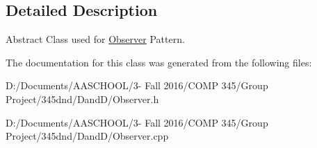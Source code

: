\subsection{Detailed Description}
Abstract Class used for \hyperlink{class_observer}{Observer} Pattern. 

The documentation for this class was generated from the following files\+:\begin{DoxyCompactItemize}
\item 
D\+:/\+Documents/\+A\+A\+S\+C\+H\+O\+O\+L/3-\/ Fall 2016/\+C\+O\+M\+P 345/\+Group Project/345dnd/\+Dand\+D/Observer.\+h\item 
D\+:/\+Documents/\+A\+A\+S\+C\+H\+O\+O\+L/3-\/ Fall 2016/\+C\+O\+M\+P 345/\+Group Project/345dnd/\+Dand\+D/Observer.\+cpp\end{DoxyCompactItemize}
